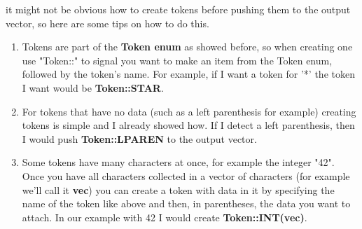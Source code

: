 \documentclass[
	12pt, %
]{fphw}
\begin{document}
\begin{problem}
    it might not be obvious how to create tokens before pushing them to the output vector, so here are some tips on how to do this.
    \\
    \begin{enumerate}
        \item Tokens are part of the \textbf{Token enum} as showed before, so when creating one use "Token::" to signal you want to make an item from the Token enum, followed by the token's name. For example, if I want a token for '*' the token I want would be \textbf{Token::STAR}.
        \item For tokens that have no data (such as a left parenthesis for example) creating tokens is simple and I already showed how. If I detect a left parenthesis, then I would push \textbf{Token::LPAREN} to the output vector.
        \item Some tokens have many characters at once, for example the integer "42". Once you have all characters collected in a vector of characters (for example we'll call it \textbf{vec}) you can create a token with data in it by specifying the name of the token like above and then, in parentheses, the data you want to attach. In our example with 42 I would create \textbf{Token::INT(vec)}.
    \end{enumerate}
\end{problem}

\pagebreak
\end{document}
